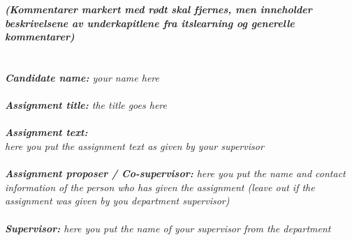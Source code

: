 \noindent
\textit{\textbf{(Kommentarer markert med rødt skal fjernes, men inneholder beskrivelsene av underkapitlene fra itslearning og generelle kommentarer)}\\\color{red}\\\\
\textbf{Candidate name:} your name here\\\\
\textbf{Assignment title:} the title goes here\\\\
\textbf{Assignment text:}\\
here you put the assignment text as given by your supervisor\\\\
\textbf{Assignment proposer / Co-supervisor:} here you put the name and contact information of the
person who has given the assignment (leave out if the assignment was given by you
department supervisor)\\\\
\textbf{Supervisor:} here you put the name of your supervisor from the department }\\
\clearpage